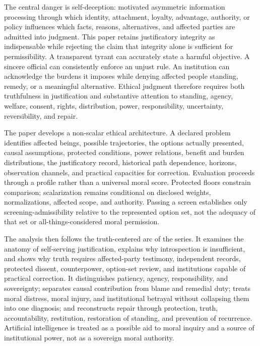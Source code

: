 \documentclass[
  11pt,
]{article}
\begin{document}
The central danger is self-deception: motivated asymmetric information
processing through which identity, attachment, loyalty, advantage,
authority, or policy influences which facts, reasons, alternatives, and
affected parties are admitted into judgment. This paper retains
justificatory integrity as indispensable while rejecting the claim that
integrity alone is sufficient for permissibility. A transparent tyrant
can accurately state a harmful objective. A sincere official can
consistently enforce an unjust rule. An institution can acknowledge the
burdens it imposes while denying affected people standing, remedy, or a
meaningful alternative. Ethical judgment therefore requires both
truthfulness in justification and substantive attention to standing,
agency, welfare, consent, rights, distribution, power, responsibility,
uncertainty, reversibility, and repair.

The paper develops a non-scalar ethical architecture. A declared problem
identifies affected beings, possible trajectories, the options actually
presented, causal assumptions, protected conditions, power relations,
benefit and burden distributions, the justificatory record, historical
path dependence, horizons, observation channels, and practical
capacities for correction. Evaluation proceeds through a profile rather
than a universal moral score. Protected floors constrain comparison;
scalarization remains conditional on disclosed weights, normalizations,
affected scope, and authority. Passing a screen establishes only
screening-admissibility relative to the represented option set, not the
adequacy of that set or all-things-considered moral permission.

The analysis then follows the truth-centered arc of the series. It
examines the anatomy of self-serving justification, explains why
introspection is insufficient, and shows why truth requires
affected-party testimony, independent records, protected dissent,
counterpower, option-set review, and institutions capable of practical
correction. It distinguishes patiency, agency, responsibility, and
sovereignty; separates causal contribution from blame and remedial duty;
treats moral distress, moral injury, and institutional betrayal without
collapsing them into one diagnosis; and reconstructs repair through
protection, truth, accountability, restitution, restoration of standing,
and prevention of recurrence. Artificial intelligence is treated as a
possible aid to moral inquiry and a source of institutional power, not
as a sovereign moral authority.
\end{document}
